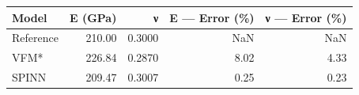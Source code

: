 \begin{tabular}{lrrrr}
\toprule
Model & E (GPa) & ν & E — Error (\%) & ν — Error (\%) \\
\midrule
Reference & 210.00 & 0.3000 & NaN & NaN \\
VFM* & 226.84 & 0.2870 & 8.02 & 4.33 \\
SPINN & 209.47 & 0.3007 & 0.25 & 0.23 \\
\bottomrule
\end{tabular}
